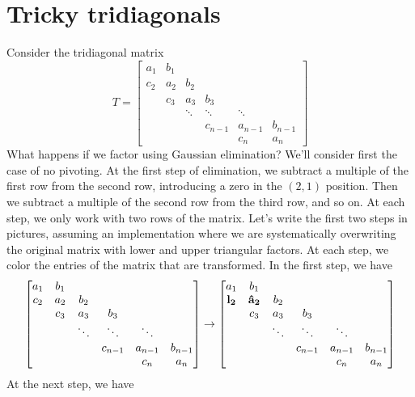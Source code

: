 \documentclass[12pt, leqno]{article}
\begin{document}

\section{Tricky tridiagonals}

Consider the tridiagonal matrix
\[
T = \begin{bmatrix}
  a_1 & b_1 \\
  c_2 & a_2 & b_2 \\
      & c_3 & a_3 & b_3 \\
      &     & \ddots & \ddots & \ddots \\
      &     &        & c_{n-1} & a_{n-1} & b_{n-1} \\
      &     &        &        & c_n     & a_n
  \end{bmatrix}
\]
What happens if we factor using Gaussian elimination?  We'll consider
first the case of no pivoting.  At the first step of elimination,
we subtract a multiple of the first row from the second row,
introducing a zero in the $(2,1)$ position.  Then we subtract a
multiple of the second row from the third row, and so on.
At each step, we only work with two rows of the matrix.  Let's write
the first two steps in pictures, assuming an implementation where
we are systematically overwriting the original matrix with lower
and upper triangular factors.  At each step, we color the entries
of the matrix that are transformed.  In the first step, we have
\[
  \begin{bmatrix}
  a_1 & b_1 \\
  c_2 & a_2 & b_2 \\
      & c_3 & a_3 & b_3 \\
      &     & \ddots & \ddots & \ddots \\
      &     &        & c_{n-1} & a_{n-1} & b_{n-1} \\
      &     &        &        & c_n     & a_n
  \end{bmatrix} \rightarrow
  \begin{bmatrix}
  a_1 & b_1 \\
  {\bf l_2} & {\bf \hat{a}_2} & b_2 \\
      & c_3 & a_3 & b_3 \\
      &     & \ddots & \ddots & \ddots \\
      &     &        & c_{n-1} & a_{n-1} & b_{n-1} \\
      &     &        &        & c_n     & a_n
  \end{bmatrix}
\]
At the next step, we have
\end{document}
